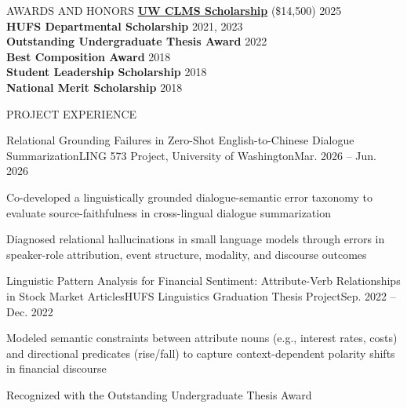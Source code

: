 \documentclass[
	11pt, %
]{resume} %
\begin{document}

\begin{rSection}{AWARDS AND HONORS}
    \textbf{\href{https://linguistics.washington.edu/honors-awards\#S06}{UW CLMS Scholarship}} (\$14,500) \hfill 2025 \\ 
    \textbf{HUFS Departmental Scholarship} \hfill 2021, 2023 \\ 
    \textbf{Outstanding Undergraduate Thesis Award} \hfill 2022 \\ 
    \textbf{Best Composition Award} \hfill 2018 \\
    \textbf{Student Leadership Scholarship} \hfill 2018 \\ 
    \textbf{National Merit Scholarship} \hfill 2018 
\end{rSection}




\begin{rSection}{PROJECT EXPERIENCE}
    \begin{rSubsection}{Relational Grounding Failures in Zero-Shot English-to-Chinese Dialogue Summarization}{}{LING 573 Project, University of Washington}{Mar. 2026 -- Jun. 2026}
        \item Co-developed a linguistically grounded dialogue-semantic error taxonomy to evaluate source-faithfulness in cross-lingual dialogue summarization
        \item Diagnosed relational hallucinations in small language models through errors in speaker-role attribution, event structure, modality, and discourse outcomes

\end{rSubsection}


	\begin{rSubsection}{Linguistic Pattern Analysis for Financial Sentiment: Attribute-Verb Relationships in Stock Market Articles}{}{HUFS Linguistics Graduation Thesis Project}{Sep. 2022 -- Dec. 2022}
		\item Modeled semantic constraints between attribute nouns (e.g., interest rates, costs) and directional predicates (rise/fall) to capture context-dependent polarity shifts in financial discourse
		\item Recognized with the Outstanding Undergraduate Thesis Award
	\end{rSubsection}
\end{rSection}
\end{document}
